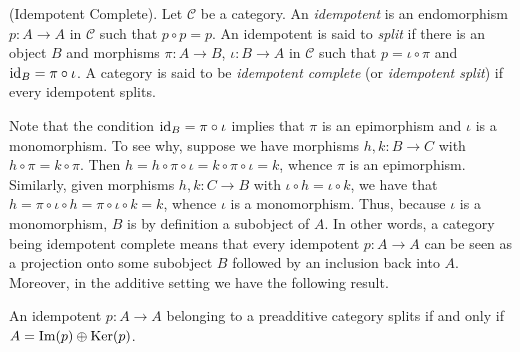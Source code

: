 
\noindent\begin{definition}\textup{(Idempotent Complete).} Let $\mathcal{C}$ be a category. An {\em idempotent} is an endomorphism $p : A \to A$ in $\mathcal{C}$ such that $p \circ p = p$. An idempotent is said to {\em split} if there is an object $B$ and morphisms $\pi : A \to B$, $\iota : B \to A$ in $\mathcal{C}$ such that $p = \iota \circ \pi$ and $\textup{id}_B = \pi \circ \iota$. A category is said to be {\em idempotent complete} (or {\em idempotent split}) if every idempotent splits.\\
\end{definition}

\noindent Note that the condition $\textup{id}_B = \pi \circ \iota$ implies that $\pi$ is an epimorphism and $\iota$ is a monomorphism. To see why, suppose we have morphisms $h, k : B \to C$ with $h \circ \pi = k \circ \pi$. Then $h = h \circ \pi \circ \iota = k \circ \pi \circ \iota = k$, whence $\pi$ is an epimorphism. Similarly, given morphisms $h, k : C \to B$ with $\iota \circ h = \iota \circ k$, we have that $h = \pi \circ \iota \circ h = \pi \circ \iota \circ k = k$, whence $\iota$ is a monomorphism. Thus, because $\iota$ is a monomorphism, $B$ is by definition a subobject of $A$. In other words, a category being idempotent complete means that every idempotent $p : A \to A$ can be seen as a projection onto some subobject $B$ followed by an inclusion back into $A$. Moreover, in the additive setting we have the following result.\\

\noindent\begin{proposition} An idempotent $p : A \to A$ belonging to a preadditive category splits if and only if $A = \textup{Im}(p) \oplus \textup{Ker}(p)$.\\
\end{proposition}

